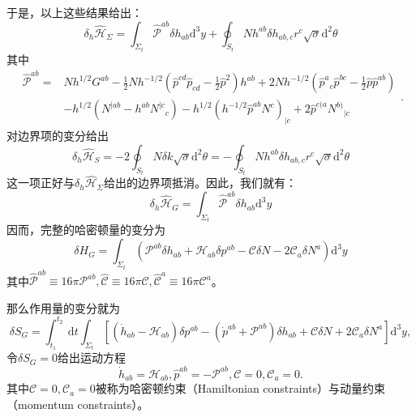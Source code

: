 \documentclass[hyperref, UTF8, a4paper]{ctexart}
\begin{document}
于是，以上这些结果给出：
\begin{equation*}
	\delta _{h}\hat{\mathcal{H}}_{\Sigma } =\int _{\Sigma _{t}}\hat{\mathcal{P}}^{ab} \delta h_{ab}\mathrm{d}^{3} y+\oint _{S_{t}} Nh^{ab} \delta h_{ab,c} r^{c}\sqrt{\sigma }\mathrm{d}^{2} \theta 
\end{equation*}
其中
\begin{equation*}
	\boxed{\begin{aligned}
			\hat{\mathcal{P}}^{ab} = & Nh^{1/2} G^{ab} -\frac{1}{2} Nh^{-1/2}\left(\hat{p}^{cd}\hat{p}_{cd} -\frac{1}{2}\hat{p}^{2}\right) h^{ab} +2Nh^{-1/2}\left(\hat{p}^{a}{}_{c}\hat{p}^{bc} -\frac{1}{2}\hat{p}\hat{p}^{ab}\right)\\
			& -h^{1/2}\left( N^{\mid ab} -h^{ab} N^{\mid c}{}_{c}\right) -h^{1/2} (h^{-1/2}\hat{p}^{ab} N^{c} )_{\mid c} +2\hat{p}^{c(a} N^{b)}{}_{|c}
	\end{aligned}} .
\end{equation*}
对边界项的变分给出
\begin{equation*}
	\delta _{h}\hat{\mathcal{H}}_{S} =-2\oint _{S_{t}} N\delta k\sqrt{\sigma }\mathrm{d}^{2} \theta =-\oint _{S_{t}} Nh^{ab} \delta h_{ab,c} r^{c}\sqrt{\sigma }\mathrm{d}^{2} \theta 
\end{equation*}
这一项正好与$\delta _{h}\hat{\mathcal{H}}_{\Sigma }$给出的边界项抵消。因此，我们就有：
\begin{equation*}
	\delta _{h}\hat{\mathcal{H}}_{G} =\int _{\Sigma _{t}}\hat{\mathcal{P}}^{ab} \delta h_{ab}\mathrm{d}^{3} y
\end{equation*}
因而，完整的哈密顿量的变分为
\begin{equation*}
	\delta H_{G} =\int _{\Sigma _{t}}\left(\mathcal{P}^{ab} \delta h_{ab} +\mathcal{H}_{ab} \delta p^{ab} -\mathcal{C} \delta N-2\mathcal{C}_{a} \delta N^{a}\right)\mathrm{d}^{3} y
\end{equation*}
其中$\hat{\mathcal{P}}^{ab} \equiv 16\pi \mathcal{P}^{ab} ,\hat{\mathcal{C}} \equiv 16\pi \mathcal{C} ,\hat{\mathcal{C}}^{a} \equiv 16\pi \mathcal{C}^{a}$。



那么作用量的变分就为
\begin{equation*}
	\delta S_{G} =\int _{t_{1}}^{t_{2}} \ \mathrm{d} t\int _{\Sigma _{t}}\left[(\dot{h}_{ab} -\mathcal{H}_{ab}) \delta p^{ab} -\left(\dot{p}^{ab} +\mathcal{P}^{ab}\right) \delta h_{ab} +\mathcal{C} \delta N+2\mathcal{C}_{a} \delta N^{a}\right]\mathrm{d}^{3} y,
\end{equation*}
令$\delta S_{G} =0$给出运动方程
\begin{equation*}
	\boxed{\dot{h}_{ab} =\mathcal{H}_{ab} ,\hat{p}^{ab} =-\mathcal{P}^{ab} ,\mathcal{C} =0,\mathcal{C}_{a} =0} .
\end{equation*}
其中$\mathcal{C} =0,\mathcal{C}_{a} =0$被称为哈密顿约束（Hamiltonian constraints）与动量约束（momentum constraints）。
\end{document}

